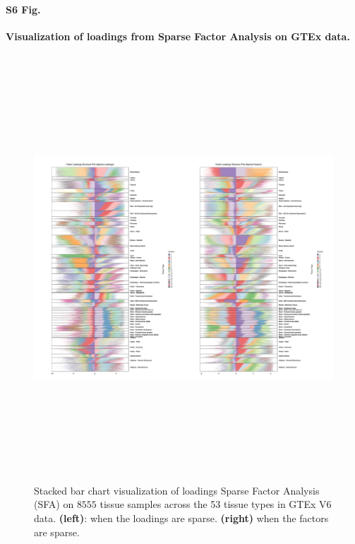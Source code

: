 \documentclass[10pt,letterpaper]{article}
\begin{document}
\paragraph*{S6 Fig.}

\label{figS6}
{\bf Visualization of loadings from Sparse Factor Analysis on GTEx data.}
\begin{figure}[ht]
\centering
\includegraphics[height=6.3in, width=7in]{../../plots/gtex-figures/sfa_gtex_figs.png}
 \caption{ Stacked bar chart visualization of loadings Sparse Factor Analysis (SFA) on $8555$ tissue samples 
 across the 53 tissue types in GTEx V6 data. \textbf{(left)}: when the loadings are sparse. \textbf{(right)} when the factors are sparse.}
\end{figure}
\end{document}
